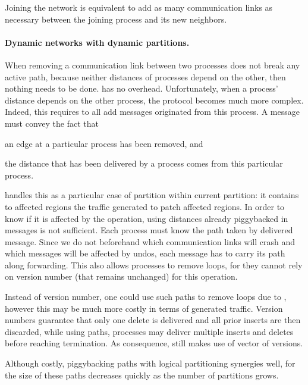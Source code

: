 \noindent Joining the network is equivalent to add as many
communication links as necessary between the joining process and its
new neighbors.

\paragraph{Dynamic networks with dynamic partitions.}
When removing a communication link between two processes does not
break any active path, because neither distances of processes depend
on the other, then nothing needs to be done. \NAME has no overhead.
Unfortunately, when a process' distance depends on the other process,
the protocol becomes much more complex. Indeed, this requires to
 all add messages originated from this process. A message
must convey the fact that
\begin{inparaenum}[(i)]
\item an edge at a particular process has been removed, and
\item the distance that has been delivered by a process comes from
  this particular process.
\end{inparaenum}

\noindent \NAME handles this as a particular case of partition within
current partition: it contains to affected regions the traffic
generated to patch affected regions. In order to know if it is
affected by the  operation, using distances already
piggybacked in messages is not sufficient.  Each process must know the
path taken by delivered message. Since we do not beforehand which
communication links will crash and which messages will be affected by
undos, each message has to carry its path along forwarding. This also
allows processes to remove loops, for they cannot rely on version
number (that remains unchanged) for this operation.

\noindent Instead of version number, one could use such paths to remove loops
due to , however this may be much more costly in
terms of generated traffic. Version numbers guarantee that only one
delete is delivered and all prior inserts are then discarded, while
using paths, processes may deliver multiple inserts and deletes before
reaching termination.  As
consequence, \NAME still makes use of vector of versions.

\noindent Although costly, piggybacking paths with logical partitioning synergies
well, for the size of these paths decreases quickly as the number of
partitions grows.

